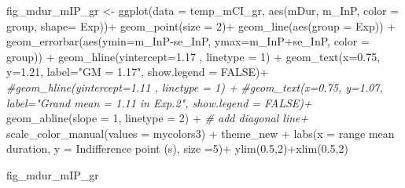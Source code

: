 \documentclass[
]{article}
\newenvironment{Shaded}{\begin{snugshade}}{\end{snugshade}}
\newcommand{\AttributeTok}[1]{\textcolor[rgb]{0.77,0.63,0.00}{#1}}
\newcommand{\CommentTok}[1]{\textcolor[rgb]{0.56,0.35,0.01}{\textit{#1}}}
\newcommand{\ConstantTok}[1]{\textcolor[rgb]{0.00,0.00,0.00}{#1}}
\newcommand{\DecValTok}[1]{\textcolor[rgb]{0.00,0.00,0.81}{#1}}
\newcommand{\FloatTok}[1]{\textcolor[rgb]{0.00,0.00,0.81}{#1}}
\newcommand{\FunctionTok}[1]{\textcolor[rgb]{0.00,0.00,0.00}{#1}}
\newcommand{\NormalTok}[1]{#1}
\newcommand{\OtherTok}[1]{\textcolor[rgb]{0.56,0.35,0.01}{#1}}
\newcommand{\SpecialCharTok}[1]{\textcolor[rgb]{0.00,0.00,0.00}{#1}}
\newcommand{\StringTok}[1]{\textcolor[rgb]{0.31,0.60,0.02}{#1}}
\begin{document}
\begin{Shaded}
\begin{Highlighting}[]
\NormalTok{fig\_mdur\_mIP\_gr }\OtherTok{\textless{}{-}} \FunctionTok{ggplot}\NormalTok{(}\AttributeTok{data =}\NormalTok{ temp\_mCI\_gr, }\FunctionTok{aes}\NormalTok{(mDur, m\_InP, }\AttributeTok{color =}\NormalTok{ group, }\AttributeTok{shape=}\NormalTok{ Exp))}\SpecialCharTok{+}
  \FunctionTok{geom\_point}\NormalTok{(}\AttributeTok{size =} \DecValTok{2}\NormalTok{)}\SpecialCharTok{+}
  \FunctionTok{geom\_line}\NormalTok{(}\FunctionTok{aes}\NormalTok{(}\AttributeTok{group =}\NormalTok{ Exp)) }\SpecialCharTok{+}
  \FunctionTok{geom\_errorbar}\NormalTok{(}\FunctionTok{aes}\NormalTok{(}\AttributeTok{ymin=}\NormalTok{m\_InP}\SpecialCharTok{{-}}\NormalTok{se\_InP, }\AttributeTok{ymax=}\NormalTok{m\_InP}\SpecialCharTok{+}\NormalTok{se\_InP, }\AttributeTok{color =}\NormalTok{ group)) }\SpecialCharTok{+} 
  \FunctionTok{geom\_hline}\NormalTok{(}\AttributeTok{yintercept=}\FloatTok{1.17}\NormalTok{ , }\AttributeTok{linetype =} \DecValTok{1}\NormalTok{) }\SpecialCharTok{+} 
  \FunctionTok{geom\_text}\NormalTok{(}\AttributeTok{x=}\FloatTok{0.75}\NormalTok{, }\AttributeTok{y=}\FloatTok{1.21}\NormalTok{, }\AttributeTok{label=}\StringTok{"GM = 1.17"}\NormalTok{, }\AttributeTok{show.legend =} \ConstantTok{FALSE}\NormalTok{)}\SpecialCharTok{+}
  \CommentTok{\#geom\_hline(yintercept=1.11 , linetype = 1) + }
  \CommentTok{\#geom\_text(x=0.75, y=1.07, label="Grand mean = 1.11 in Exp.2", show.legend = FALSE)+}
  \FunctionTok{geom\_abline}\NormalTok{(}\AttributeTok{slope =} \DecValTok{1}\NormalTok{, }\AttributeTok{linetype =} \DecValTok{2}\NormalTok{) }\SpecialCharTok{+} \CommentTok{\# add diagonal line+}
  \FunctionTok{scale\_color\_manual}\NormalTok{(}\AttributeTok{values =}\NormalTok{ mycolors3) }\SpecialCharTok{+}
\NormalTok{  theme\_new }\SpecialCharTok{+}
  \FunctionTok{labs}\NormalTok{(}\AttributeTok{x =} \StringTok{\textquotesingle{}range mean duration\textquotesingle{}}\NormalTok{, }\AttributeTok{y =} \StringTok{\textquotesingle{}Indifference point (s)\textquotesingle{}}\NormalTok{, }\AttributeTok{size =}\DecValTok{5}\NormalTok{)}\SpecialCharTok{+}
  \FunctionTok{ylim}\NormalTok{(}\FloatTok{0.5}\NormalTok{,}\DecValTok{2}\NormalTok{)}\SpecialCharTok{+}\FunctionTok{xlim}\NormalTok{(}\FloatTok{0.5}\NormalTok{,}\DecValTok{2}\NormalTok{)}

\NormalTok{fig\_mdur\_mIP\_gr}
\end{Highlighting}
\end{Shaded}
\end{document}
